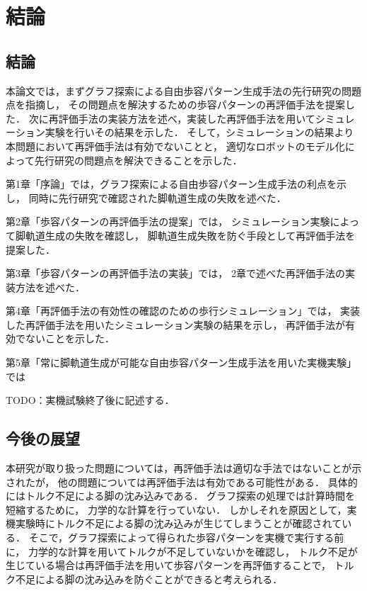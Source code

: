 ﻿

\chapter{結論}\label{chapter:結論}

\section{結論}

本論文では，まずグラフ探索による自由歩容パターン生成手法の先行研究の問題点を指摘し，
その問題点を解決するための歩容パターンの再評価手法を提案した．
次に再評価手法の実装方法を述べ，実装した再評価手法を用いてシミュレーション実験を行いその結果を示した．
そして，シミュレーションの結果より本問題において再評価手法は有効でないことと，
適切なロボットのモデル化によって先行研究の問題点を解決できることを示した．

第1章「序論」では，グラフ探索による自由歩容パターン生成手法の利点を示し，
同時に先行研究で確認された脚軌道生成の失敗を述べた．

第2章「歩容パターンの再評価手法の提案」では，
シミュレーション実験によって脚軌道生成の失敗を確認し，
脚軌道生成失敗を防ぐ手段として再評価手法を提案した．

第3章「歩容パターンの再評価手法の実装」では，
2章で述べた再評価手法の実装方法を述べた．

第4章「再評価手法の有効性の確認のための歩行シミュレーション」では，
実装した再評価手法を用いたシミュレーション実験の結果を示し，
再評価手法が有効でないことを示した．

第5章「常に脚軌道生成が可能な自由歩容パターン生成手法を用いた実機実験」では

TODO：実機試験終了後に記述する．

\section{今後の展望}
本研究が取り扱った問題については，再評価手法は適切な手法ではないことが示されたが，
他の問題については再評価手法は有効である可能性がある．
具体的にはトルク不足による脚の沈み込みである．
グラフ探索の処理では計算時間を短縮するために，
力学的な計算を行っていない．
しかしそれを原因として，実機実験時にトルク不足による脚の沈み込みが生じてしまうことが確認されている．
そこで，グラフ探索によって得られた歩容パターンを実機で実行する前に，
力学的な計算を用いてトルクが不足していないかを確認し，
トルク不足が生じている場合は再評価手法を用いて歩容パターンを再評価することで，
トルク不足による脚の沈み込みを防ぐことができると考えられる．

